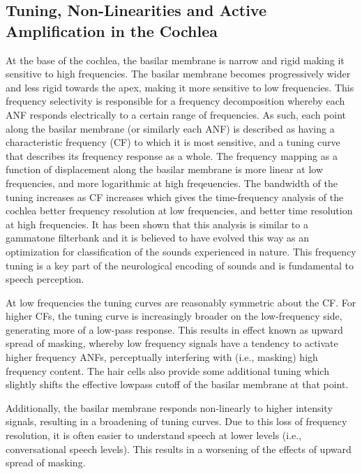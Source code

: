 
\subsection{Tuning, Non-Linearities and Active Amplification in the Cochlea} \label{section:hearing_non_linearities}

At the base of the cochlea, the basilar membrane is narrow and rigid making it sensitive to high frequencies. The basilar membrane becomes progressively wider and less rigid towards the apex, making it more sensitive to low frequencies. This frequency selectivity is responsible for a frequency decomposition whereby each ANF responds electrically to a certain range of frequencies. As such, each point along the basilar membrane (or similarly each ANF) is described as having a characteristic frequency (CF) to which it is most sensitive, and a tuning curve that describes its frequency response as a whole. The frequency mapping as a function of displacement along the basilar membrane is more linear at low frequencies, and more logarithmic at high freqeuencies. The bandwidth of the tuning increases as CF increases which gives the time-frequency analysis of the cochlea better frequency resolution at low frequencies, and better time resolution at high frequencies. It has been shown that this analysis is similar to a gammatone filterbank \citep{lewicki2002coding} and it is believed to have evolved this way as an optimization for classification of the sounds experienced in nature. This frequency tuning is a key part of the neurological encoding of sounds and is fundamental to speech perception.

At low frequencies the tuning curves are reasonably symmetric about the CF. For higher CFs, the tuning curve is increasingly broader on the low-frequency side, generating more of a low-pass response.  This results in effect known as upward spread of masking, whereby low frequency signals have a tendency to activate higher frequency ANFs, perceptually interfering with (i.e., masking) high frequency content. The hair cells also provide some additional tuning which slightly shifts the effective lowpass cutoff of the basilar membrane at that point.

Additionally, the basilar membrane responds non-linearly to higher intensity signals, resulting in a broadening of tuning curves. Due to this loss of frequency resolution, it is often easier to understand speech at lower levels (i.e., conversational speech levels). This results in a worsening of the effects of upward spread of masking.

